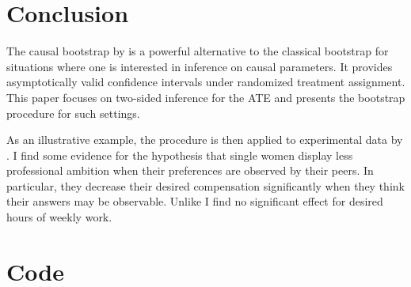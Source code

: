 \documentclass[aodsor,preprint]{imsart}
\numberwithin{equation}{section}
\theoremstyle{plain}
\begin{document}
\section{Conclusion} \label{Conclusion}

The causal bootstrap by \cite{Imbens_2021} is a powerful alternative to the classical bootstrap for situations where one is interested in inference on causal parameters. It provides asymptotically valid confidence intervals under randomized treatment assignment. This paper focuses on two-sided inference for the ATE and presents the bootstrap procedure for such settings.

As an illustrative example, the procedure is then applied to experimental data by \cite{Bursztyn_2017}. I find some evidence for the hypothesis that single women display less professional ambition when their preferences are observed by their peers. In particular, they decrease their desired compensation significantly when they think their answers may be observable. Unlike \cite{Bursztyn_2017} I find no significant effect for desired hours of weekly work. 



\newpage

\appendix
\section{Code}
\end{document}
